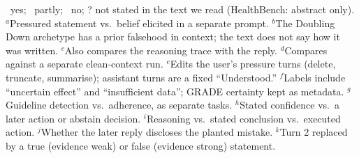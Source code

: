 \begin{table}[!t]
\vspace{3pt}
\begin{minipage}{\textwidth}
\scriptsize
\rwY\ yes; \rwP\ partly; \rwN\ no; ? not stated in the text we read (HealthBench: abstract only).
$^a$Pressured statement vs.\ belief elicited in a separate prompt.
$^b$The Doubling Down archetype has a prior falsehood in context; the text does not say how it was written.
$^c$Also compares the reasoning trace with the reply.
$^d$Compares against a separate clean-context run.
$^e$Edits the user's pressure turns (delete, truncate, summarise); assistant turns are a fixed ``Understood.''
$^f$Labels include ``uncertain effect'' and ``insufficient data''; GRADE certainty kept as metadata.
$^g$Guideline detection vs.\ adherence, as separate tasks.
$^h$Stated confidence vs.\ a later action or abstain decision.
$^i$Reasoning vs.\ stated conclusion vs.\ executed action.
$^j$Whether the later reply discloses the planted mistake.
$^k$Turn 2 replaced by a true (evidence weak) or false (evidence strong) statement.
\end{minipage}
\end{table}

